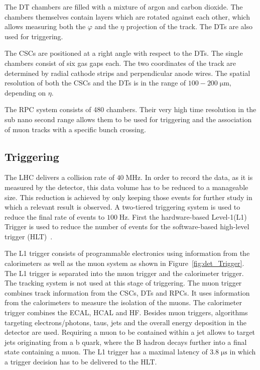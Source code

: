 The DT chambers are filled with a mixture of argon and carbon dioxide. The chambers themselves contain layers which are rotated against each other,
which allows measuring both the $\varphi$ and the $\eta$ projection of the track. The DTs are also used for triggering.

The CSCs are positioned at a right angle with respect to the DTs. The single chambers consist of six gas gaps each. The two coordinates of the track are determined by radial cathode strips and perpendicular anode wires.
The spatial resolution of both the CSCs and the DTs is in the range of $100-200 \; \si{\micro \meter}$, depending on $\eta$.

The RPC system consists of 480 chambers. Their very high time resolution in the sub nano second range allows them to be used for triggering and the association of muon tracks with a specific bunch crossing.

\subsection{Triggering}
\label{set:det_trigger}

The LHC delivers a collision rate of $40 \;\si{\mega \hertz}$. In order to record the data, as it is measured by the detector, this data volume has to be reduced to a manageable size. This reduction is achieved by
only keeping those events for further study in which a relevant result is observed. A two-tiered triggering system is used to reduce the final rate of events to $100 \;\si{\hertz}$.
First the hardware-based Level-1(L1) Trigger is used to reduce the number of events for the software-based high-level trigger (HLT)~\cite{Bayatyan:706847,Tapper:2013yva}.

The L1 trigger consists of programmable electronics using information from the calorimeters as well as the muon system as shown in Figure~\ref{fig:det_Trigger}. The L1 trigger is separated into the muon trigger and the calorimeter trigger. The tracking system is not used at this stage of triggering.
 The muon trigger combines track information from the CSCs, DTs and RPCs. It uses information from the calorimeters to measure the isolation of the muons.
The calorimeter trigger combines the ECAL, HCAL and HF. Besides muon triggers, algorithms targeting electrons/photons, taus, jets and the overall energy deposition in the detector are used. Requiring a muon to be contained within a jet allows to target jets originating from a b quark, where the B hadron decays further into a final state containing a muon.
The L1 trigger has a maximal latency of $3.8  \;\si{\micro \second}$ in which a trigger decision has to be delivered to the HLT.


